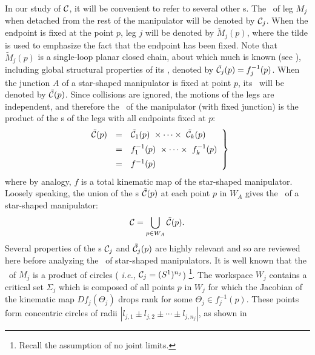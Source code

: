 In our study of ${\cal C}$, it will be convenient to refer to
several other \cspace s. The \cspace \ of leg $M_j$ when detached
from the rest of the manipulator will be denoted by ${\cal C}_j$.
When the endpoint is fixed at the point $p$, leg $j$ will be
denoted by $\tilde M_j(p)$, where the tilde is used to emphasize
the fact that the endpoint has been fixed. Note that $\tilde
M_j(p)$ is a single-loop planar closed chain, about which much is
known (see \cite{MT2}), including global structural properties of
its \cspace, denoted by $\tilde {\cal C}_j(p) = f_j^{-1}(p)$. When
the junction $A$ of a star-shaped manipulator is fixed at point
$p$, its \cspace \ will be denoted by $\tilde {\cal C}(p)$. Since
collisions are ignored, the motions of the legs are independent,
and therefore the \cspace \ of the manipulator (with fixed
junction) is the product of the \cspace s of the legs with all
endpoints fixed at $p$:
%
\begin{equation}
\label{eq:def_tildeCp}
   \left. \begin{array}{rcl}
   \tilde {\cal C}(p) & = & \tilde {\cal C}_1(p) \ \times
           \cdots \times \ \tilde {\cal C}_k(p) \\ [5pt]
          & = & f_1^{-1}(p) \ \times \cdots \times \ f_k^{-1}(p) \\ [5pt]
          & = & f^{-1}(p)
   \end{array} \right\}
\end{equation}
%
where by analogy, $f$ is a total kinematic map of the star-shaped
manipulator. Loosely speaking, the union of the \cspace s $\tilde
{\cal C}(p)$ at each point $p$ in $W_A$ gives the \cspace \ of a
star-shaped manipulator: 
%
\begin{equation}
\label{eq:def_C}
   {\cal C} = \bigcup_{p \in W_A} \tilde {\cal C}(p).
\end{equation}
%
Several properties of the \cspace s ${\cal C}_j$ and $\tilde {\cal
C}_j(p)$ are highly relevant and so are reviewed here before
analyzing the \cspace \ of star-shaped manipulators.  It is well
known that the \cspace \ of $M_j$ is a product of circles ({\em
i.e.,} ${\cal C}_j = (S^1)^{n_j}$)
\footnote{Recall the assumption of no joint limits.}. The
workspace $W_j$ contains a critical set $\Sigma_j$ which is
composed of all points $p$ in $W_j$ for which the Jacobian of the
kinematic map $Df_j(\Theta_j)$ drops rank for some $\Theta_j \in
f_j^{-1}(p)$. These points form concentric circles of radii
$|l_{j,1}\pm l_{j,2} \pm \cdots \pm l_{j,n_j}|$, as shown in
